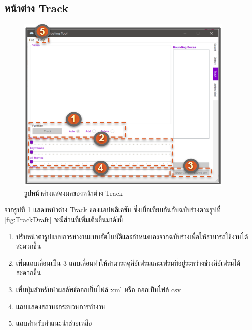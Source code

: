 \clearpage
\subsection*{หน้าต่าง Track}
\begin{figure}[!ht]
  \centering
    \includegraphics[scale=1.2]{chapter4/images/New_Final_ui/Track.png}
    \caption{รูปหน้าต่างแสดงผลของหน้าต่าง Track}
    \label{fig:final_track}
\end{figure}
จากรูปที่ \ref{fig:final_track} แสดงหน้าต่าง Track ของแอปพลิเคชัน ซึ่งเมื่อเทียบกันกับฉบับร่างตามรูปที่ \ref{fig:TrackDraft} จะมีส่วนที่เพิ่มเติมขึ้นมาดังนี้
\begin{enumerate}
	\item ปรับหน้าตารูปแบบการทำงานแบบอัตโนมัติและกำหนดเองจากฉบับร่างเพื่อให้สามารถใช้งานได้สะดวกขึ้น
	\item เพิ่มแถบเลื่อนเป็น 3 แถบเลื่อนทำให้สามารถดูคีย์เฟรมและเฟรมที่อยู่ระหว่างช่วงคีย์เฟรมได้สะดวกขึ้น
	\item เพิ่มปุ่มสำหรับนำผลลัพธ์ออกเป็นไฟล์ xml  หรือ ออกเป็นไฟล์ csv
	\item แถบแสดงสถานะกระบวนการทำงาน
	\item แถบสำหรับคำแนะนำช่วยเหลือ
\end{enumerate}		

\clearpage
